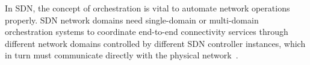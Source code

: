 


In SDN, the concept of orchestration is vital to automate network operations properly. SDN network domains need single-domain or multi-domain orchestration systems to coordinate end-to-end connectivity services through different network domains controlled by different SDN controller instances, which in turn must communicate directly with the physical network~\cite{SDNevolution}.

